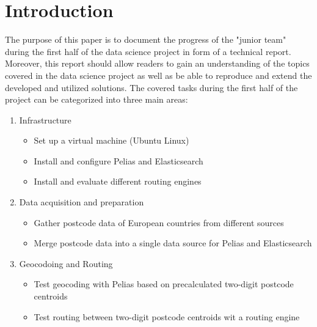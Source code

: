 
\section{Introduction}
The purpose of this paper is to document the progress of the "junior team" during the first half of the data science project in form of a technical report. Moreover, this report should allow readers to gain an understanding of the topics covered in the data science project as well as be able to reproduce and extend the developed and utilized solutions.
The covered tasks during the first half of the project can be categorized into three main areas:
\begin{enumerate}
\item Infrastructure
\begin{itemize}
\item Set up a virtual machine (Ubuntu Linux)
\item Install and configure Pelias and Elasticsearch
\item Install and evaluate different routing engines
\end{itemize}
\item Data acquisition and preparation
\begin{itemize}
\item Gather postcode data of European countries from different sources
\item Merge postcode data into a single data source for Pelias and Elasticsearch
\end{itemize}
\item Geocodoing and Routing
\begin{itemize}
\item Test geocoding with Pelias based on precalculated two-digit postcode centroids
\item Test routing between two-digit postcode centroids wit a routing engine
\end{itemize}
\end{enumerate}
